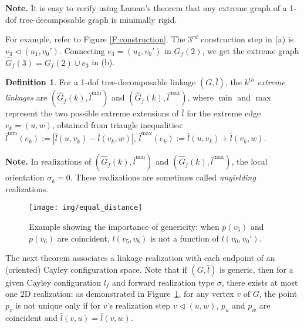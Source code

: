 \documentclass[secthm,amsthm,english]{article}
\theoremstyle{definition}
\newtheorem{definition}{Definition}
\theoremstyle{remark}
\begin{document}
\noindent\textbf{Note.}
It is easy to verify using Laman's theorem \cite{bib:Laman70} that any extreme graph
of a 1-dof tree-decomposable graph is minimally rigid.
\smallskip


For example, refer to Figure \ref{F:construction}. 
The $3^{rd}$ construction step in (a) is $v_{3}\triangleleft(u_1,v_0')$.
Connecting $e_{3}=(u_1,v_0')$ in $G_{f}(2)$, we get the extreme
graph $\hat{G}_{f}(3)=G_{f}(2)\cup e_{3}$ in (b). 




\begin{definition}\label{def:extreme-linkage}For a 1-dof tree-decomposable linkage $(G,\bar{l})$,
the $k^{th}$ {\emph{extreme linkages}}\emph{ }are $(\hat{G}_{f}(k),\bar{l}^{\min})$
and $(\hat{G}_{f}(k),\bar{l}^{\max})$, where $\min$ and $\max$ represent
the two possible extreme extensions of $\bar{l}$ for the extreme edge
$e_{k}=(u,w)$, obtained from triangle inequalities: 
$\bar{l}^{\min}(e_{k}):=|\bar{l}(u,v_{k})-\bar{l}(v_{k},w)|$,
$\bar{l}^{\max}(e_{k}):=\bar{l}(u,v_{k})+\bar{l}(v_{k},w)$. 
\end{definition}



\noindent\textbf{Note.} In realizations of $(\hat{G}_{f}(k),\bar{l}^{\min})$
and $(\hat{G}_{f}(k),\bar{l}^{\max})$, the local orientation $\sigma_k = 0$.
These realizations are sometimes called \emph{unyielding} realizations. 




\begin{figure}[h]
	  
	  
	  
	
	\begin{centering}
	\texttt{[image: img/equal\_distance]}
	\par\end{centering}
	
	\caption{Example showing the importance of genericity: when $p(v_{5})$ and $p(v_{6})$ are coincident, $l(v_{5},v_{8})$
	is not a function of $l(v_{0},v_{0}')$.}
	
	\label{F:equal-distance} 
\end{figure}





The next theorem associates a linkage realization with each endpoint of an (oriented) Cayley configuration space. Note that if $(G, \bar{l})$ is generic, then for a given Cayley configuration $l_f$ and forward realization type $\sigma$, there exists at most one 2D realization:  
as demonstrated in Figure~\ref{F:equal-distance}, 
for any vertex $v$ of $G$, the point $p_v$ is not unique only if for $v$'s realization step $v \triangleleft (u,w)$,
$p_u$ and $p_w$ are coincident and $\bar{l}(v,u) = \bar{l}(v,w)$.
\end{document}
